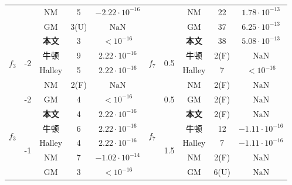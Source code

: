 \begin{center}
\begin{longtable}[!htbp]{c|c|ccc|c|c|ccc}
    & 	   & 	NM  & 	5  & 	$-2.22 \cdot 10^{-16}$&	   & 	   & 	NM  & 	22  & 	$1.78 \cdot 10^{-13}$\\
 
    & 	   & 	GM  & 	3(U)  & 	$\text{NaN}$&	   & 	   & 	GM  & 	37  & 	$6.25 \cdot 10^{-13}$\\
 
    & 	   & 	\textbf{本文}  & 	3  & 	$< 10^{-16}$&	   & 	   & 	\textbf{本文}  & 	38  & 	$5.08 \cdot 10^{-13}$\\
 
 \cline{2-5}\cline{7-10}
 \hline



    \multirow{2}{*}{$f_3$} & 	\multirow{2}{*}{-2}  & 	牛顿  & 	9  & 	$2.22 \cdot 10^{-16}$&	\multirow{2}{*}{$f_7$}    & 	\multirow{2}{*}{0.5}  & 	牛顿  & 	2(F)  & 	$\text{NaN}$\\

    & 	   & 	Halley  & 	5  & 	$2.22 \cdot 10^{-16}$&	   & 	   & 	Halley  & 	7  & 	$< 10^{-16}$\\

    & 	\multirow{3}{*}{-2}     & 	NM  & 	2(F)  & 	$\text{NaN}$&	   & 	\multirow{3}{*}{0.5}     & 	NM  & 	2(F)  & 	$\text{NaN}$\\

    & 	   & 	GM  & 	4  & 	$< 10^{-16}$&	   & 	   & 	GM  & 	2(F)  & 	$\text{NaN}$\\

    \multirow{4}{*}{$f_3$}& 	   & 	\textbf{本文}  & 	4  & 	$2.22 \cdot 10^{-16}$&	 \multirow{4}{*}{$f_7$}  & 	   & 	\textbf{本文}  & 	2(F)  & 	$\text{NaN}$\\

\cline{2-5}\cline{7-10}
    & 	\multirow{5}{*}{-1}  & 	牛顿  & 	6  & 	$2.22 \cdot 10^{-16}$&	   & 	\multirow{5}{*}{1.5}  & 	牛顿  & 	12  & 	$-1.11 \cdot 10^{-16}$\\

    & 	   & 	Halley  & 	4  & 	$2.22 \cdot 10^{-16}$&	   & 	   & 	Halley  & 	7  & 	$-1.11 \cdot 10^{-16}$\\

    & 	   & 	NM  & 	7  & 	$-1.02 \cdot 10^{-14}$&	   & 	   & 	NM  & 	2(F)  & 	$\text{NaN}$\\

    & 	   & 	GM  & 	3  & 	$< 10^{-16}$&	   & 	   & 	GM  & 	6(U)  & 	$\text{NaN}$\\


\end{longtable}
\end{center}
